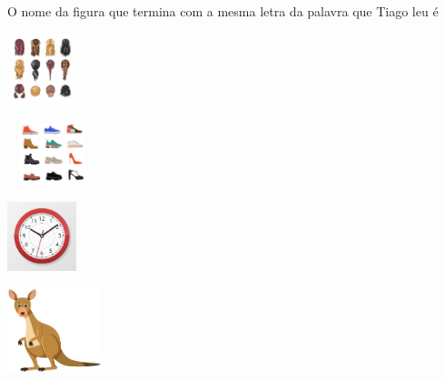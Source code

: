 O nome da figura que termina com a mesma letra da palavra que Tiago leu é

\begin{escolha}
\item\includegraphics[width=0.79792in,height=0.81667in]{media/image44.jpeg}

\item\includegraphics[width=1.02847in,height=0.72292in]{media/image45.jpeg}

\item\includegraphics[width=0.79792in,height=0.79931in]{media/image46.jpeg}

\item\includegraphics[width=1.08611in,height=0.97222in]{media/image47.jpeg}
\end{escolha}



